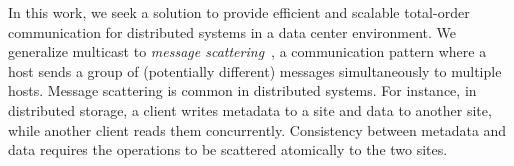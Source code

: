 In this work, we seek a solution to provide efficient and scalable total-order communication for distributed systems in a data center environment.
We generalize multicast to \textit{message scattering}~\cite{kshemkalyani2011distributed}, a communication pattern where a host sends a group of (potentially different) messages simultaneously to multiple hosts.
Message scattering is common in distributed systems.
For instance, in distributed storage, a client writes metadata to a site and data to another site, while another client reads them concurrently. Consistency between metadata and data requires the operations to be scattered atomically to the two sites.



